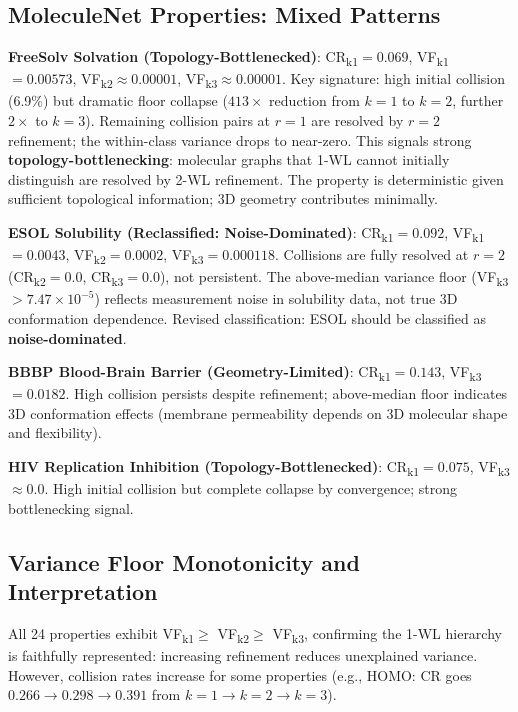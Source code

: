\documentclass[11pt,letterpaper]{article}
\begin{document}
\subsection{MoleculeNet Properties: Mixed Patterns}

\textbf{FreeSolv Solvation (Topology-Bottlenecked)}:
CR\textsubscript{k1}$= 0.069$, VF\textsubscript{k1}$= 0.00573$, VF\textsubscript{k2}$\approx 0.00001$, VF\textsubscript{k3}$\approx 0.00001$. Key signature: high initial collision (6.9\%) but dramatic floor collapse ($413\times$ reduction from $k=1$ to $k=2$, further $2\times$ to $k=3$). Remaining collision pairs at $r=1$ are resolved by $r=2$ refinement; the within-class variance drops to near-zero. This signals strong \textbf{topology-bottlenecking}: molecular graphs that 1-WL cannot initially distinguish are resolved by 2-WL refinement. The property is deterministic given sufficient topological information; 3D geometry contributes minimally.

\textbf{ESOL Solubility (Reclassified: Noise-Dominated)}:
CR\textsubscript{k1}$= 0.092$, VF\textsubscript{k1}$= 0.0043$, VF\textsubscript{k2}$= 0.0002$, VF\textsubscript{k3}$= 0.000118$. Collisions are fully resolved at $r=2$ (CR\textsubscript{k2}$= 0.0$, CR\textsubscript{k3}$= 0.0$), not persistent. The above-median variance floor (VF\textsubscript{k3}$> 7.47\times10^{-5}$) reflects measurement noise in solubility data, not true 3D conformation dependence. Revised classification: ESOL should be classified as \textbf{noise-dominated}.

\textbf{BBBP Blood-Brain Barrier (Geometry-Limited)}:
CR\textsubscript{k1}$= 0.143$, VF\textsubscript{k3}$= 0.0182$. High collision persists despite refinement; above-median floor indicates 3D conformation effects (membrane permeability depends on 3D molecular shape and flexibility).

\textbf{HIV Replication Inhibition (Topology-Bottlenecked)}:
CR\textsubscript{k1}$= 0.075$, VF\textsubscript{k3}$\approx 0.0$. High initial collision but complete collapse by convergence; strong bottlenecking signal.

\subsection{Variance Floor Monotonicity and Interpretation}

All 24 properties exhibit VF\textsubscript{k1}$\geq$ VF\textsubscript{k2}$\geq$ VF\textsubscript{k3}, confirming the 1-WL hierarchy is faithfully represented: increasing refinement reduces unexplained variance. However, collision rates increase for some properties (e.g., HOMO: CR goes $0.266 \to 0.298 \to 0.391$ from $k=1 \to k=2 \to k=3$).
\end{document}
